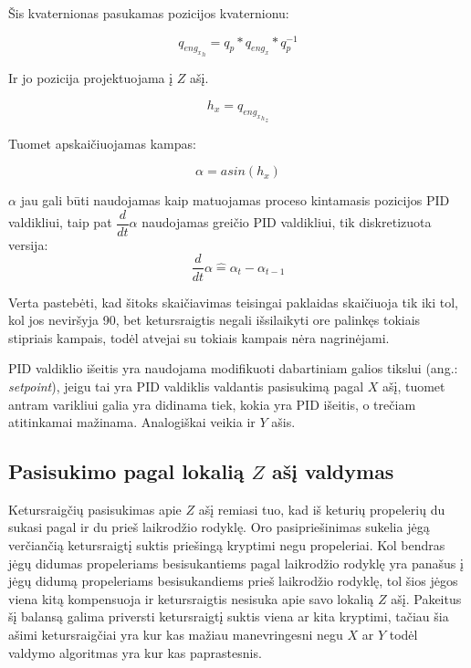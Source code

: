 \documentclass[12pt, a4paper, lithuanian, final]{article}
\begin{document}
Šis kvaternionas pasukamas pozicijos kvaternionu:

\begin{equation}
	q_{{eng_x}_h} = q_p * q_{eng_x} * q_p^{-1}
\end{equation}

Ir jo pozicija projektuojama į $Z$ ašį.

\begin{equation}
	h_x = q_{{{eng_x}_h}_z}
\end{equation}

Tuomet apskaičiuojamas kampas:

\begin{equation}
	\alpha = asin(h_x)
\end{equation}

$\alpha$ jau gali būti naudojamas kaip matuojamas proceso kintamasis pozicijos PID valdikliui, taip pat $\dfrac{d}{dt}\alpha$ naudojamas greičio PID valdikliui, tik diskretizuota versija:
\begin{equation}
	\dfrac{d}{dt}\alpha \widehat{=} \alpha_t - \alpha_{t-1}
\end{equation}


Verta pastebėti, kad šitoks skaičiavimas teisingai paklaidas skaičiuoja tik iki tol, kol jos neviršyja 90\degree, bet ketursraigtis negali išsilaikyti ore palinkęs tokiais stipriais kampais, todėl atvejai su tokiais kampais nėra nagrinėjami.

PID valdiklio išeitis yra naudojama modifikuoti dabartiniam galios tikslui (ang.: \textit{setpoint}), jeigu tai yra PID valdiklis valdantis pasisukimą pagal $X$ ašį, tuomet antram varikliui galia yra didinama tiek, kokia yra PID išeitis, o trečiam atitinkamai mažinama.
Analogiškai veikia ir $Y$ ašis.

\subsection{Pasisukimo pagal lokalią $Z$ ašį valdymas}

Ketursraigčių pasisukimas apie $Z$ ašį remiasi tuo, kad iš keturių propelerių du sukasi pagal ir du prieš laikrodžio rodyklę.
Oro pasipriešinimas sukelia jėgą verčiančią ketursraigtį suktis priešingą kryptimi negu propeleriai.
Kol bendras jėgų didumas propeleriams besisukantiems pagal laikrodžio rodyklę yra panašus į jėgų didumą propeleriams besisukandiems prieš laikrodžio rodyklę, tol šios jėgos viena kitą kompensuoja ir ketursraigtis nesisuka apie savo lokalią $Z$ ašį.
Pakeitus šį balansą galima priversti ketursraigtį suktis viena ar kita kryptimi, tačiau šia ašimi ketursraigčiai yra kur kas mažiau manevringesni negu $X$ ar $Y$ todėl valdymo algoritmas yra kur kas paprastesnis.
\end{document}
